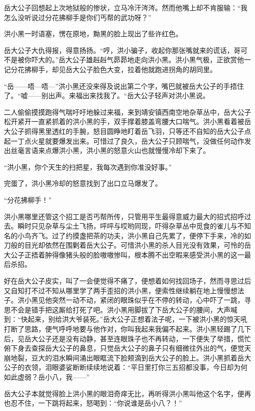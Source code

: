 岳大公子回想起上次地狱般的惨状，立马冷汗涔涔。然而他嘴上却不肯服输：“我怎么没听说过分花拂柳手是你们丐帮的武功呀？”

洪小黑一时语塞，愣在原地，黝黑的脸上现出了些许红色。

岳大公子大仇得报，得意扬扬。“哼，洪小骗子，收起你那张嘴就来的谎话，哥可不是被你吓大的。”岳大公子雄赳赳气昴昴地走向洪小黑。洪小黑气极，正欲赏他一记分花拂柳手，却见岳大公子脸色大变，拉着他就跑进拐角的胡同里。

“岳------唔---唔---”洪小黑还没来得及说出第二个字，嘴巴就被岳大公子的手捂住了。“嘘------别出声。来福出来找我了。“岳大公子轻声对洪小黑说。


\splitline

二人偷偷摸摸跑得气喘吁吁地躲过来福，来到靖安镇西南空地杂草丛中，岳大公子松开紧开一直紧抓着的洪小黑的手，双手撑着膝盖弯腰大口喘气。洪小黑看着被岳大公子抓得黑里透红的手腕，怒目圆睁地盯着岳飞羽，只等还不自知的岳大公子点起一丁点火星就要爆发出来。可惜过了良久，岳大公子只顾喘气，没做任何动作发出丝毫言语来点爆洪小黑，洪小黑的怒意火山也就慢慢冷却下来了。

“洪小黑，你个天生的扫把星，我每次遇到你准没好事。”

完蛋了，洪小黑冷却的怒意找到了出口立马爆发了。

“分花拂柳手！”

洪小黑哪里还管这个招工是否丐帮所传，只管用平生最得意威力最大的招式招呼过去。瞬时只见杂草与尘土飞扬，呯呯与哎哟同现，吓得杂草丛中觅食的雀儿与不知名的小鸟齐飞。过了约摸盏把茶的功夫，洪小黑自己先累了，便停下手来，冷的如刀般的目光却依然在围剿着岳大公子。可惜洪小黑的杀人目光没有效果，可怜的岳大公子正捂着肿得像猪头般的脸嗷嗷惨叫，根本腾不出空暇来感受洪小黑的这一最后杀招。

好在岳大公子皮实，叫了一会便觉得不痛了，便想着如何找回场子，然而寻思过后又自知打不过不知从哪里学了两手歪招的洪小黑，便索性继续躺在地上慢慢想法子。洪小黑见他突然一动不动，紧闭的眼珠似乎在不停的转动，心中吓了一跳，寻思不会是错手把这厮给打死了吧。洪小黑用脚拔了下岳大公子的腰间，大声喊到：“快起来，别给洪大爷装死。”岳大公子正想着法子呢，一下被洪小黑的惊天吼打断了思路，便气呼呼地要与他作对，你叫我起来我偏不起来。洪小黑轻踢了几下后，见岳大公子还是没有动静，甚至连眼珠子也不再转动，一下便失了举措，慌忙俯下身去查探岳大公子的鼻息，只觉岳大公子的鼻子只有细微往外出的气，便觉天崩地裂，豆大的泪水瞬间涌出眼眶流下脸颊滴到岳大公子的脸上。洪小黑抓着岳大公子的衣领，泪眼婆娑断断续续地说着：“平日里打你三五招都没事，今日却为何如此虚弱？岳小八，我------”

岳大公子本就觉得脸上洪小黑的眼泪奇痒无比，再听得洪小黑叫他这个名字，便再也忍不住，一下跳将起来，怒喝到：“你说谁是岳小八？！”

